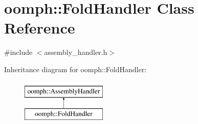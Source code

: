 \hypertarget{classoomph_1_1FoldHandler}{}\section{oomph\+:\+:Fold\+Handler Class Reference}
\label{classoomph_1_1FoldHandler}


{\ttfamily \#include $<$assembly\+\_\+handler.\+h$>$}

Inheritance diagram for oomph\+:\+:Fold\+Handler\+:\begin{figure}[H]
\begin{center}
\leavevmode
\includegraphics[height=2.000000cm]{classoomph_1_1FoldHandler}
\end{center}
\end{figure}
